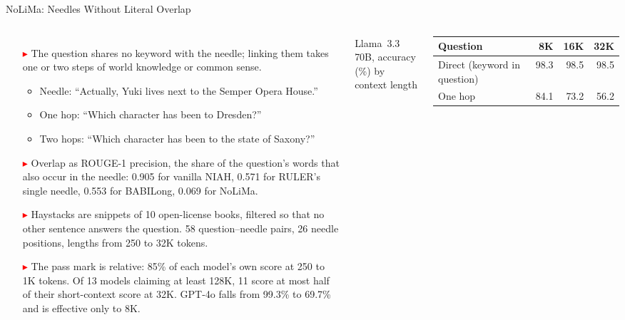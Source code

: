 \begin{frame}{NoLiMa: Needles Without Literal Overlap}
  \begin{columns}[T,onlytextwidth]
      \begin{itemize}\scriptsize\itemsep0.3em
        \item[\textcolor{red}{$\blacktriangleright$}] The question shares no keyword with the needle; linking them takes one or two steps of world knowledge or common sense.\par
          \begin{itemize}\scriptsize\itemsep0.05em
            \item Needle: ``Actually, Yuki lives next to the Semper Opera House.''
            \item One hop: ``Which character has been to Dresden?''
            \item Two hops: ``Which character has been to the state of Saxony?''
          \end{itemize}
        \item[\textcolor{red}{$\blacktriangleright$}] Overlap as ROUGE-1 precision, the share of the question's words that also occur in the needle: 0.905 for vanilla NIAH, 0.571 for RULER's single needle, 0.553 for BABILong, 0.069 for NoLiMa.
        \item[\textcolor{red}{$\blacktriangleright$}] Haystacks are snippets of 10 open-license books, filtered so that no other sentence answers the question. 58 question--needle pairs, 26 needle positions, lengths from 250 to 32K tokens.
        \item[\textcolor{red}{$\blacktriangleright$}] The pass mark is relative: 85\% of each model's own score at 250 to 1K tokens. Of 13 models claiming at least 128K, 11 score at most half of their short-context score at 32K. GPT-4o falls from 99.3\% to 69.7\% and is effective only to 8K.
      \end{itemize}
      \centering
      \vspace{0.6em}
      {\scriptsize Llama~3.3 70B, accuracy (\%) by context length\\[0.3em]
      \setlength{\tabcolsep}{4pt}\begin{tabular}{lrrr}
        \toprule
        \textbf{Question} & \textbf{8K} & \textbf{16K} & \textbf{32K} \\
        \midrule
        Direct (keyword in question) & 98.3 & 98.5 & 98.5 \\
        One hop & 84.1 & 73.2 & 56.2 \\

\end{tabular}}
\end{columns}
\end{frame}
